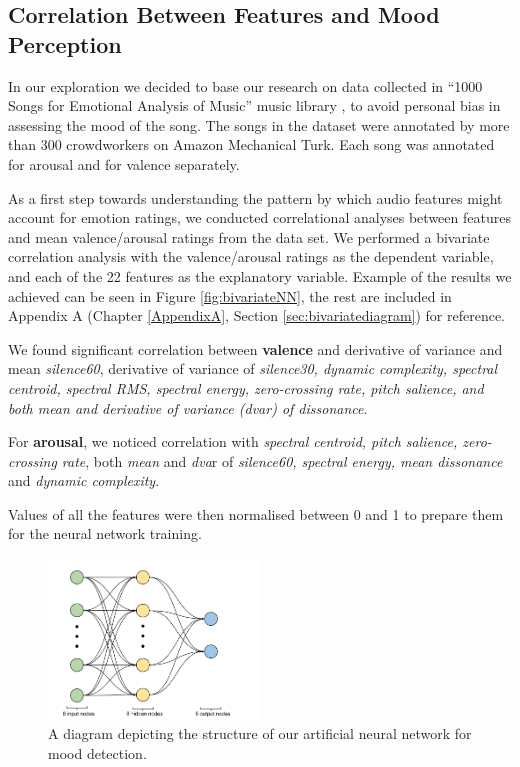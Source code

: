 \vspace{10pt}

\subsection{Correlation Between Features and Mood Perception}

In our exploration we decided to base our research on data collected in ``1000 Songs for Emotional Analysis of Music'' music library \cite{1000songs}, to avoid personal bias in assessing the mood of the song. The songs in the dataset were annotated by more than 300 crowdworkers on Amazon Mechanical Turk. Each song was annotated for arousal and for valence separately.

As a first step towards understanding the pattern by which audio features might account for emotion ratings, we conducted correlational analyses between features and mean valence/arousal ratings from the data set. We performed a bivariate correlation analysis with the valence/arousal ratings as the dependent variable, and each of the 22 features as the explanatory variable. Example of the results we achieved can be seen in Figure \ref{fig:bivariateNN}, the rest are included in Appendix A (Chapter \ref{AppendixA}, Section \ref{sec:bivariatediagram}) for reference. 

We found significant correlation between \textbf{valence} and derivative of variance and mean \textit{silence60}, derivative of variance of \textit{silence30, dynamic complexity, spectral centroid, spectral RMS, spectral energy, zero-crossing rate, pitch salience, and both mean and derivative of variance (dvar) of dissonance}. 

For \textbf{arousal}, we noticed correlation with \textit{spectral centroid, pitch salience, zero-crossing rate}, both \textit{mean} and \textit{dva}r of  \textit{silence60, spectral energy, mean dissonance} and \textit{dynamic complexity}. 

Values of all the features were then normalised between 0 and 1 to prepare them for the neural network training. 

\begin{figure}
  \vspace{-30pt}
  \begin{center}
    \includegraphics[width=0.5\textwidth]{Figures/myANN}
  \end{center}
  \caption{A diagram depicting the structure of our artificial neural network for mood detection.}
\label{fig:finalnetwork}
\end{figure}


